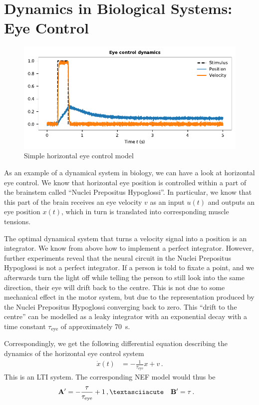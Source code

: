 \documentclass[10pt,letterpaper,oneside]{article}
\begin{document}
\section{Dynamics in Biological Systems: Eye Control}

\begin{figure}
	\centering
	\includegraphics{media/example_eye_control.pdf}
	\caption{Simple horizontal eye control model}
\end{figure}

As an example of a dynamical system in biology, we can have a look at horizontal eye control. We know that horizontal eye position is controlled within a part of the brainstem called \enquote{Nuclei Prepositus Hypoglossi}. In particular, we know that this part of the brain receives an eye velocity $v$ as an input $u(t)$ and outputs an eye position $x(t)$, which in turn is translated into corresponding muscle tensions.

The optimal dynamical system that turns a velocity signal into a position is an integrator. We know from above how to implement a perfect integrator. However, further experiments reveal that the neural circuit in the Nuclei Prepositus Hypoglossi is not a perfect integrator. If a person is told to fixate a point, and we afterwards turn the light off while telling the person to still look into the same direction, their eye will drift back to the centre. This is not due to some mechanical effect in the motor system, but due to the representation produced by the Nuclei Prepositus Hypoglossi converging back to zero. This \enquote{drift to the centre} can be modelled as a leaky integrator with an exponential decay with a time constant $\tau_\mathrm{eye}$ of approximately \SI{70}{\second}.

Correspondingly, we get the following differential equation describing the dynamics of the horizontal eye control system
\begin{align*}
	\dot x(t) &= - \frac{1}{\tau_\mathrm{eye}} x + v \,.
\end{align*}
This is an LTI system. The corresponding NEF model would thus be
\begin{align*}
	\mat A' &=  - \frac{\tau}{\tau_\mathrm{eye}} + 1 \,,´&
	\mat B' &= \tau \,.
\end{align*}

\printbibliography
\end{document}
